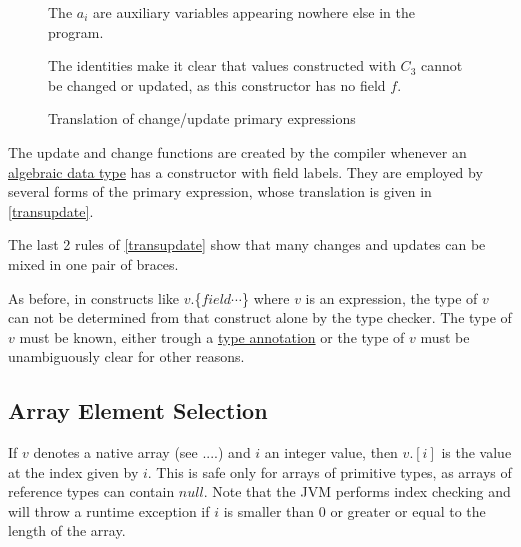 \begin{figure}[hbt]
{    
\par The $a_i$ are auxiliary variables appearing nowhere else in the program. 
\par The identities make it clear that values constructed with $C_3$ cannot be changed or updated, as this constructor has no field $f$.
}
\caption{Translation of change/update primary expressions}
\label{transupdate}
\end{figure}

The update and change functions are created by the compiler whenever an \hyperref[algdcl]{algebraic data type} has a constructor with field labels. They are employed by several forms of the primary expression, whose translation is given in \autoref{transupdate}.

The last 2 rules of  \autoref{transupdate} show that many changes and updates can be mixed in one pair of braces. 

As before, in constructs like $v$.\{$field \cdots$\} where $v$ is an expression, the type of $v$ can not be determined from that construct alone by the type checker. The type of $v$ must be known, either trough a \hyperref[annotation]{type annotation} or the type of $v$ must be unambiguously clear for other reasons.  

\subsection{Array Element Selection} \label{arrayop}

If $v$ denotes a native array (see ....) and $i$ an integer value, then $v.[i]$ is the value at the index given by $i$. This is safe only for arrays of primitive types, as arrays of reference types can contain \ex$null$. Note that the JVM performs index checking and will throw a runtime exception if $i$ is smaller than 0 or greater or equal to the length of the array.


